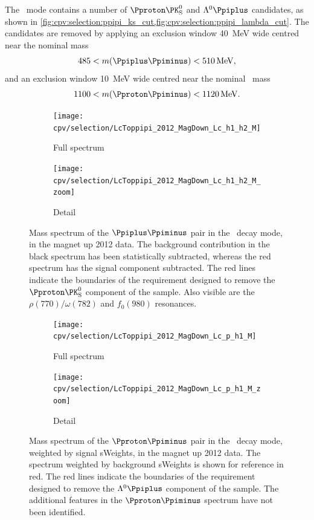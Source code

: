 The \ppipi\ mode contains a number of $\Pproton\PKshort$ and $\PLambda\Ppiplus$ 
candidates, as shown in 
\cref{fig:cpv:selection:ppipi_ks_cut,fig:cpv:selection:ppipi_lambda_cut}.
The candidates are removed by applying an exclusion window \SI{40}{\MeV} wide 
centred near the nominal \PKshort mass~\cite{PDG2014}
\begin{equation}
  485 < m(\Ppiplus\Ppiminus) < \SI{510}{\MeV},
\end{equation}
and an exclusion window \SI{10}{\MeV} wide centred near the nominal \PLambda\ 
mass~\cite{PDG2014}
\begin{equation}
  1100 < m(\Pproton\Ppiminus) < \SI{1120}{\MeV}.
\end{equation}

\begin{figure}
  \begin{subfigure}[b]{0.5\textwidth}
    \texttt{[image: cpv/selection/LcToppipi\_2012\_MagDown\_Lc\_h1\_h2\_M]}
    \caption{Full spectrum}
    \label{fig:cpv:selection:ppipi_ks_cut:full}
  \end{subfigure}
  \begin{subfigure}[b]{0.5\textwidth}
    \texttt{[image: cpv/selection/LcToppipi\_2012\_MagDown\_Lc\_h1\_h2\_M\_zoom]}
    \caption{Detail}
    \label{fig:cpv:selection:ppipi_ks_cut:zoom}
  \end{subfigure}
  \caption{%
    Mass spectrum of the $\Ppiplus\Ppiminus$ pair in the \ppipi\ decay mode, in 
    the magnet up 2012 data.
    The background contribution in the black spectrum has been statistically 
    subtracted, whereas the red spectrum has the signal component subtracted.
    The red lines indicate the boundaries of the requirement designed to remove 
    the $\Pproton\PKshort$ component of the sample.
    Also visible are the $\rho(770)/\omega(782)$ and $f_{0}(980)$ resonances.
  }
  \label{fig:cpv:selection:ppipi_ks_cut}
\end{figure}

\begin{figure}
  \begin{subfigure}[b]{0.5\textwidth}
    \texttt{[image: cpv/selection/LcToppipi\_2012\_MagDown\_Lc\_p\_h1\_M]}
    \caption{Full spectrum}
    \label{fig:cpv:selection:ppipi_lambda_cut:full}
  \end{subfigure}
  \begin{subfigure}[b]{0.5\textwidth}
    \texttt{[image: cpv/selection/LcToppipi\_2012\_MagDown\_Lc\_p\_h1\_M\_zoom]}
    \caption{Detail}
    \label{fig:cpv:selection:ppipi_lambda_cut:zoom}
  \end{subfigure}
  \caption{%
    Mass spectrum of the $\Pproton\Ppiminus$ pair in the \ppipi\ decay mode, 
    weighted by signal sWeights, in the magnet up 2012 data.
    The spectrum weighted by background sWeights is shown for reference in red.
    The red lines indicate the boundaries of the requirement designed to remove 
    the $\PLambda\Ppiplus$ component of the sample.
    The additional features in the $\Pproton\Ppiminus$ spectrum have not been 
    identified.
  }
  \label{fig:cpv:selection:ppipi_lambda_cut}
\end{figure}

